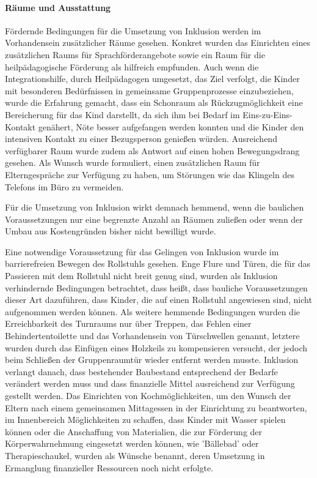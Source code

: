 \paragraph{Räume und Ausstattung}
Fördernde Bedingungen für die Umsetzung von Inklusion werden im Vorhandensein zusätzlicher Räume gesehen. Konkret wurden das Einrichten eines zusätzlichen Raums für Sprachförderangebote sowie ein Raum für die heilpädagogische Förderung als hilfreich empfunden. Auch wenn die Integrationshilfe, durch Heilpädagogen umgesetzt, das Ziel verfolgt, die Kinder mit besonderen Bedürfnissen in gemeinsame Gruppenprozesse einzubeziehen, wurde die Erfahrung gemacht, dass ein Schonraum als Rückzugmöglichkeit eine Bereicherung für das Kind darstellt, da sich ihm bei Bedarf im Eins-zu-Eins-Kontakt genähert, Nöte besser aufgefangen werden konnten und die Kinder den intensiven Kontakt zu einer Bezugsperson genießen würden. Ausreichend verfügbarer Raum wurde zudem als Antwort auf einen hohen Bewegungsdrang gesehen. Als Wunsch wurde formuliert, einen zusätzlichen Raum für Elterngespräche zur Verfügung zu haben, um Störungen wie das Klingeln des Telefons im Büro zu vermeiden. 

Für die Umsetzung von Inklusion wirkt demnach hemmend, wenn die baulichen Voraussetzungen nur eine begrenzte Anzahl an Räumen zuließen oder wenn der Umbau aus Kostengründen bisher nicht bewilligt wurde. 

Eine notwendige Voraussetzung für das Gelingen von Inklusion wurde im  barrierefreien Bewegen des Rollstuhls gesehen. Enge Flure und Türen, die für das Passieren mit dem Rollstuhl nicht breit genug sind, wurden als Inklusion verhindernde Bedingungen betrachtet, dass heißt, dass bauliche Voraussetzungen dieser Art dazuführen, dass Kinder, die auf einen Rollstuhl angewiesen sind, nicht aufgenommen werden können. Als weitere hemmende Bedingungen wurden die Erreichbarkeit des Turnraums nur über Treppen, das Fehlen einer Behindertentoilette und das Vorhandensein von Türschwellen genannt, letztere wurden durch das Einfügen eines Holzkeils zu kompensieren versucht, der jedoch beim Schließen der Gruppenraumtür wieder entfernt werden musste. %
Inklusion verlangt danach, dass bestehender Baubestand entsprechend der Bedarfe verändert werden muss und dass finanzielle Mittel ausreichend zur Verfügung gestellt werden. Das Einrichten von Kochmöglichkeiten, um den Wunsch der Eltern nach einem gemeinsamen Mittagessen in der Einrichtung zu beantworten, im Innenbereich Möglichkeiten zu schaffen, dass Kinder mit Wasser spielen können oder die Anschaffung von Materialien, die zur Förderung der Körperwahrnehmung eingesetzt werden können, wie 'Bällebad' oder Therapieschaukel, wurden als Wünsche benannt, deren Umsetzung in Ermanglung finanzieller Ressourcen noch nicht erfolgte. 
 
